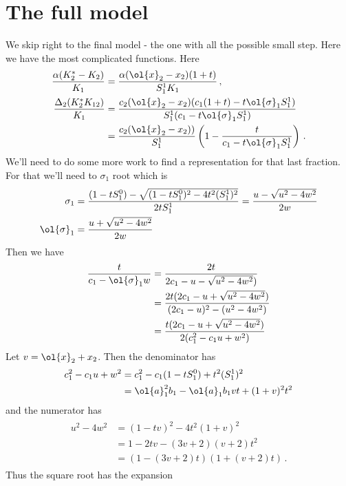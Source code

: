 \section{The full model}
We skip right to the final model - the one with all the possible small step. Here we have the most complicated functions. Here
\begin{align}
	\frac{\alpha(K_2^\ast -K_2)}{K_1}  &= \frac{\alpha (\ol{x}_2 - x_2)(1+t)}{S_1^1K_1}\,,\\
	\frac{\Delta_2(K_2^\ast K_{12})}{K_1} &= \frac{c_2(\ol{x}_2-x_2)(c_1(1+t)- t \ol{\sigma}_1S_1^1)}{S_1^1(c_1-t\ol{\sigma}_1S_1^1)}\\
	&=\frac{c_2(\ol{x}_2-x_2))}{S_1^1}\left(1-\frac{t}{c_1-t\ol{\sigma}_1S_1^1}\right)\,.
\end{align}
We'll need to do some more work to find a representation for that last fraction. For that we'll need to $\sigma_1$ root which is
\begin{align}
	\sigma_1 &= \frac{(1-tS_1^0)-\sqrt{(1-tS_1^0)^2-4t^2(S_1^1)^2}}{2tS_1^1} = \frac{u-\sqrt{u^2-4w^2}}{2w}\\
	\ol{\sigma}_1 &= \frac{u+\sqrt{u^2-4w^2}}{2w}
\end{align}
Then we have
\begin{align}
\begin{split}
	\frac{t}{c_1-\ol{\sigma}_1w} &= \frac{2t}{2c_1-u-\sqrt{u^2-4w^2})} \\
	&= \frac{2t(2c_1-u+\sqrt{u^2-4w^2})}{(2c_1-u)^2-(u^2-4w^2)}\\
	&=  \frac{t(2c_1-u+\sqrt{u^2-4w^2})}{2(c_1^2-c_1u+w^2)}
\end{split}
\end{align}
Let $v = \ol{x}_2+x_2$. Then the denominator has
\begin{align}
\begin{split}
	c_1^2-c_1u+w^2 &= c_1^2-c_1(1-tS_1^0)+t^2(S_1^1)^2\\&=\ol{a}_1^2b_1 - \ol{a}_1b_1vt+(1+v)^2 t^2
\end{split}
\end{align}
and the numerator has
\begin{align}
\begin{split}
	u^2-4w^2 &= (1-tv)^2-4t^2(1+v)^2 \\&= 1-2tv-(3v+2)(v+2)t^2 \\&= (1-(3v+2)t)(1+(v+2)t)\,.
\end{split}
\end{align}
Thus the square root has the expansion
